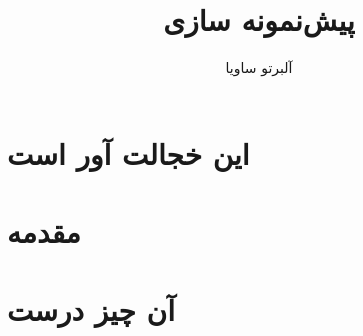 \documentclass[a5paper,14pt]{book}
\author{آلبرتو ساویا}
\title{پیش‌نمونه سازی}
\begin{document}
\maketitle
\frontmatter
\tableofcontents

\chapter{این خجالت آور است}

\chapter{مقدمه}

\mainmatter
\chapter{آن چیز درست}

\end{document}
